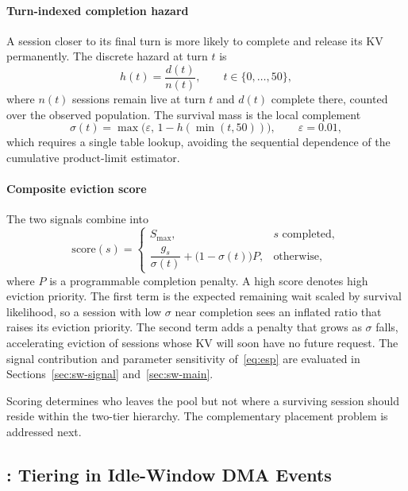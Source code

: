 \paragraph{Turn-indexed completion hazard}
A session closer to its final turn is more likely to complete and
release its KV permanently. The discrete hazard at turn $t$ is
\begin{equation}
  h(t)=\frac{d(t)}{n(t)},
  \qquad
  t\in\{0,\ldots,50\},
  \label{eq:hazard}
\end{equation}
where $n(t)$ sessions remain live at turn $t$ and $d(t)$ complete
there, counted over the observed population. The survival mass is the
local complement
\begin{equation}
  \sigma(t)
  =\max\bigl(\varepsilon,\,1-h(\min(t,50))\bigr),
  \qquad
  \varepsilon=0.01,
  \label{eq:surv}
\end{equation}
which requires a single table lookup, avoiding the sequential
dependence of the cumulative product-limit estimator.

\paragraph{Composite eviction score}
The two signals combine into
\begin{equation}
  \mathrm{score}(s)
  =
  \begin{cases}
    S_{\max},
      & s\text{ completed},\\[2pt]
    \dfrac{g_s}{\sigma(t)}+\bigl(1-\sigma(t)\bigr)P,
      & \text{otherwise},
  \end{cases}
  \label{eq:esp}
\end{equation}
where $P$ is a programmable completion penalty. A high score denotes
high eviction priority. The first term is the expected remaining wait
scaled by survival likelihood, so a session with low $\sigma$
near completion sees an inflated ratio that raises its eviction
priority. The
second term adds a penalty that grows as $\sigma$ falls, accelerating
eviction of sessions whose KV will soon have no future request. The
signal contribution and parameter sensitivity of~\eqref{eq:esp} are
evaluated in Sections~\ref{sec:sw-signal} and~\ref{sec:sw-main}.

Scoring determines who leaves the pool but not where a surviving
session should reside within the two-tier hierarchy. The
complementary placement problem is addressed next.

\subsection{\tide: Tiering in Idle-Window DMA Events}
\label{sec:okt}

